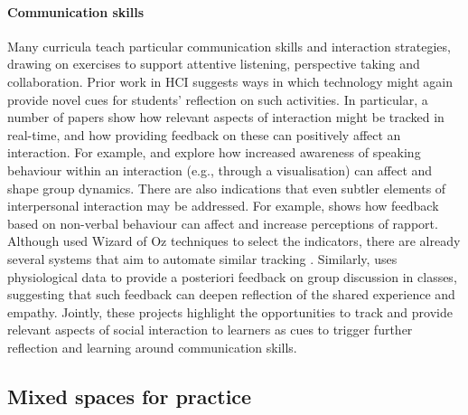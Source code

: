 \documentclass[prodmode,acmtochi]{acmsmall}
\newcommand{\todolater}[1]{}
\begin{document}
\paragraph{Communication skills}
\label{sec:strategies}
Many curricula teach particular communication skills and interaction strategies, drawing on exercises to support attentive listening, perspective taking and collaboration. 
%
Prior work in HCI suggests ways in which technology might again provide novel cues for students' reflection on such activities. In particular, a number of papers show how relevant aspects of interaction might be tracked in real-time, and how providing feedback on these can positively affect an interaction. For example,   and  explore how increased awareness of speaking behaviour within an interaction (e.g., through a visualisation) can affect and shape group dynamics. 
There are also indications that even subtler elements of interpersonal interaction may be addressed. For example,  shows how feedback based on non-verbal behaviour can affect and increase perceptions of rapport. Although  used Wizard of Oz techniques to select the indicators, there are already several systems that aim to automate similar tracking \cite{Sun2011,Hagad2011}. Similarly,  uses physiological data to provide a posteriori feedback on group discussion in classes, suggesting that such feedback can deepen reflection of the shared experience and empathy. 
%
Jointly, these projects highlight the opportunities to track and provide relevant aspects of social interaction to learners as cues to trigger further reflection and learning around communication skills. 
\todolater{???but could also serve as a scaffolding to promote deeper discussion with the group, cf. Section~\ref{sec:socialReflection} below.}






\subsection{Mixed spaces for practice}
\label{sec:mixedSpaces}
\end{document}

